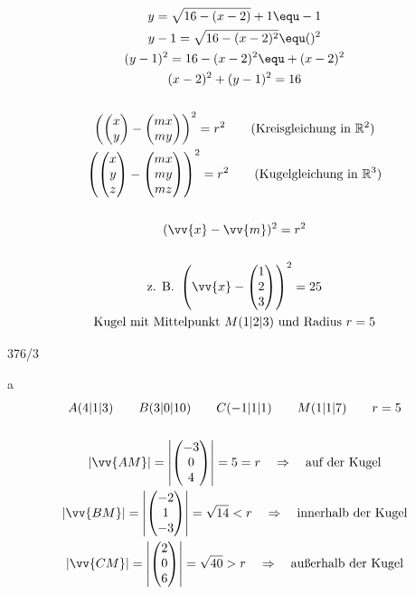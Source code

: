 \begin{gather*}
  y = \sqrt{16 - (x - 2)} + 1 \equ -1 \\
  y - 1 = \sqrt{16 - (x - 2)^2} \equ ()^2 \\
  (y - 1)^2 = 16 - (x - 2)^2 \equ + (x - 2)^2 \\
  (x - 2)^2 + (y - 1)^2 = 16 \\\\
  \left(\begin{pmatrix}x \\ y\end{pmatrix} - \begin{pmatrix}mx \\ my\end{pmatrix}\right)^2 = r^2 \qquad \text{(Kreisgleichung in $\mathbb{R}^2$)} \\
  \left(\begin{pmatrix}x \\ y \\ z\end{pmatrix} - \begin{pmatrix}mx \\ my \\ mz\end{pmatrix}\right)^2 = r^2 \qquad \text{(Kugelgleichung in $\mathbb{R}^3$)} \\\\
  (\vv{x} - \vv{m})^2 = r^2 \\\\
  \text{z. B. } \left(\vv{x} - \begin{pmatrix}1 \\ 2 \\ 3\end{pmatrix}\right)^2 = 25 \\
  \text{Kugel mit Mittelpunkt $M(1|2|3)$ und Radius $r = 5$}
\end{gather*}
\begin{exercise}{376/3}
  \item [a]
  \begin{gather*}
    A(4|1|3) \qquad B(3|0|10) \qquad C(-1|1|1) \qquad M(1|1|7) \qquad r = 5 \\\\
    |\vv{AM}| = \left|\begin{pmatrix}-3 \\ 0 \\ 4\end{pmatrix}\right| = 5 = r \quad\Rightarrow\quad\text{auf der Kugel} \\
    |\vv{BM}| = \left|\begin{pmatrix}-2 \\ 1 \\ -3\end{pmatrix}\right| = \sqrt{14} < r \quad\Rightarrow\quad\text{innerhalb der Kugel} \\
    |\vv{CM}| = \left|\begin{pmatrix}2 \\ 0 \\ 6\end{pmatrix}\right| = \sqrt{40} > r \quad\Rightarrow\quad\text{außerhalb der Kugel}
  \end{gather*}
\end{exercise}
